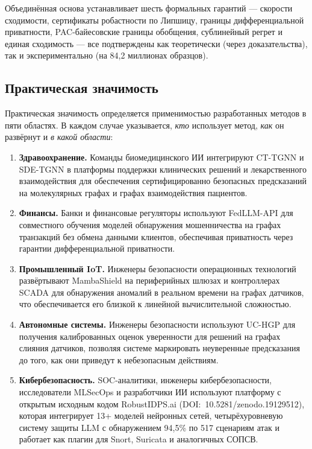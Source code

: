 \documentclass[12pt,a5paper]{article}
\begin{document}
Объединённая основа устанавливает шесть формальных гарантий --- скорости сходимости, сертификаты робастности по Липшицу, границы дифференциальной приватности, PAC-байесовские границы обобщения, сублинейный регрет и единая сходимость --- все подтверждены как теоретически (через доказательства), так и экспериментально (на 84,2 миллионах образцов).


\subsection*{Практическая значимость}

Практическая значимость определяется применимостью разработанных методов в пяти областях. В каждом случае указывается, \emph{кто} использует метод, \emph{как} он развёрнут и \emph{в какой области}:

\begin{enumerate}
\item \textbf{Здравоохранение.} Команды биомедицинского ИИ интегрируют CT-TGNN и SDE-TGNN в платформы поддержки клинических решений и лекарственного взаимодействия для обеспечения сертифицированно безопасных предсказаний на молекулярных графах и графах взаимодействия пациентов.

\item \textbf{Финансы.} Банки и финансовые регуляторы используют FedLLM-API для совместного обучения моделей обнаружения мошенничества на графах транзакций без обмена данными клиентов, обеспечивая приватность через гарантии дифференциальной приватности.

\item \textbf{Промышленный IoT.} Инженеры безопасности операционных технологий развёртывают MambaShield на периферийных шлюзах и контроллерах SCADA для обнаружения аномалий в реальном времени на графах датчиков, что обеспечивается его близкой к линейной вычислительной сложностью.

\item \textbf{Автономные системы.} Инженеры безопасности используют UC-HGP для получения калиброванных оценок уверенности для решений на графах слияния датчиков, позволяя системе маркировать неуверенные предсказания до того, как они приведут к небезопасным действиям.

\item \textbf{Кибербезопасность.} SOC-аналитики, инженеры кибербезопасности, исследователи MLSecOps и разработчики ИИ используют платформу с открытым исходным кодом RobustIDPS.ai (DOI:~10.5281/zenodo.19129512), которая интегрирует 13+ моделей нейронных сетей, четырёхуровневую систему защиты LLM с обнаружением 94,5\% по 517 сценариям атак и работает как плагин для Snort, Suricata и аналогичных СОПСВ.
\end{enumerate}
\end{document}
